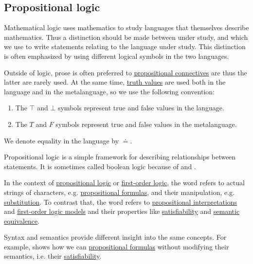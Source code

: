 \subsection{Propositional logic}\label{subsec:propositional_logic}

\begin{remark}\label{remark:metalanguage}
  Mathematical logic uses mathematics to study languages that themselves describe mathematics. Thus a distinction should be made between  under study, and  which we use to write statements relating to the language under study. This distinction is often emphasized by using different logical symbols in the two languages.

  Outside of logic, prose is often preferred to \hyperref[def:propositional_alphabet/connectives]{propositional connectives} are thus the latter are rarely used. At the same time, \hyperref[def:propositional_alphabet/constants]{truth values} are used both in the language and in the metalanguage, so we use the following convention:
  \begin{enumerate}
    \item The \( \top \) and \( \bot \) symbols represent true and false values in the language.
    \item The \( T \) and \( F \) symbols represent true and false values in the metalanguage.
  \end{enumerate}

  We denote equality in the language by \( \doteq \).

  Propositional logic is a simple framework for describing relationships between statements. It is sometimes called boolean logic because of  and .
\end{remark}

\begin{remark}\label{remark:syntax_vs_semantics}
  In the context of \hyperref[subsec:propositional_logic]{propositional logic} or \hyperref[subsec:first_order_logic]{first-order logic}, the word  refers to actual strings of characters, e.g. \hyperref[def:propositional_formula]{propositional formulas}, and their manipulation, e.g. \hyperref[def:propositional_substition]{substitution}. To contrast that, the word  refers to \hyperref[def:propositional_interpretation]{propositional interpretations} and \hyperref[def:first_order_model]{first-order logic models} and their properties like \hyperref[def:propositional_interpretation/satisfiability]{satisfiability} and \hyperref[def:propositional_interpretation/equivalence]{semantic equivalence}.

  Syntax and semantics provide different insight into the same concepts. For example,  shows how we can \hyperref[def:propositional_formula]{propositional formulas} without modifying their semantics, i.e. their \hyperref[def:propositional_interpretation/satisfiability]{satisfiability}.
\end{remark}

